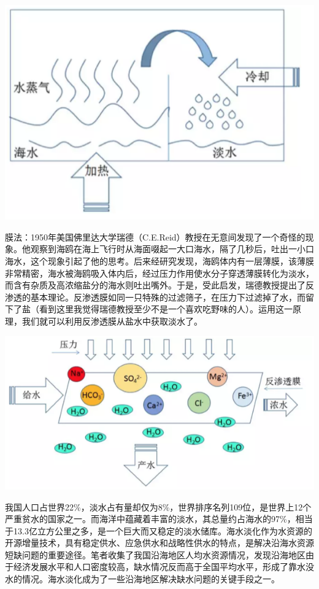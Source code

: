 \documentclass[]{book}
\begin{document}
\includegraphics[width=8.33in]{images/seawater1}

膜法：1950年美国佛里达大学瑞德（C.E.Reid）教授在无意间发现了一个奇怪的现象。他观察到海鸥在海上飞行时从海面啜起一大口海水，隔了几秒后，吐出一小口海水，这个现象引起了他的思考。后来经研究发现，海鸥体内有一层薄膜，该薄膜非常精密，海水被海鸥吸入体内后，经过压力作用使水分子穿透薄膜转化为淡水，而含有杂质及高浓缩盐分的海水则吐出嘴外。于是，受此启发，瑞德教授提出了反渗透的基本理论。反渗透膜如同一只特殊的过滤筛子，在压力下过滤掉了水，而留下了盐（看到这里我觉得瑞德教授至少不是一个喜欢吃野味的人）。运用这一原理，我们就可以利用反渗透膜从盐水中获取淡水了。

\includegraphics[width=8.33in]{images/seawater2}

我国人口占世界22\%，淡水占有量却仅为8\%，世界排序名列109位，是世界上12个严重贫水的国家之一。而海洋中蕴藏着丰富的淡水，其总量约占海水的97\%，相当于13.3亿立方公里之多，是一个巨大而又稳定的淡水储库。海水淡化作为水资源的开源增量技术，具有稳定供水、应急供水和战略性供水的特点，是解决沿海水资源短缺问题的重要途径。笔者收集了我国沿海地区人均水资源情况，发现沿海地区由于经济发展水平和人口密度较高，缺水情况反而高于全国平均水平，形成了靠水没水的情况。海水淡化成为了一些沿海地区解决缺水问题的关键手段之一。
\end{document}
